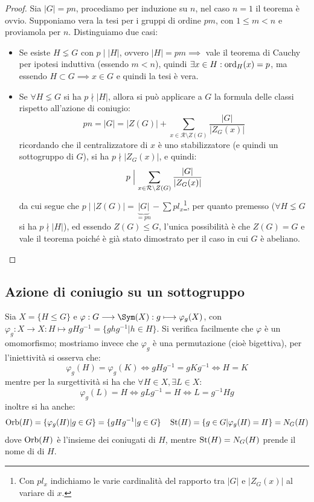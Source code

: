 \documentclass[11pt]{scrartcl}
\begin{document}
\begin{proof}
    Sia $|G| = pn$, procediamo per induzione su $n$, nel caso $n = 1$ il teorema è ovvio. Supponiamo vera la tesi per i gruppi di ordine $pm$, con 
    $1 \leq m < n$ e proviamola per $n$. Distinguiamo due casi:
        \begin{itemize}
            \item Se esiste $H \lneq G$ con $p \mid |H|$, ovvero $|H| = pm \implies$ vale il teorema di Cauchy per ipotesi induttiva (essendo $m<n$), quindi 
            $\exists x \in H : \operatorname{ord}_H(x) = p$, ma essendo $H \subset G \implies x \in G$ e quindi la tesi è vera.
            \item Se $\forall H \lneq G$ si ha $p \nmid |H|$, allora si può applicare a $G$ la formula delle classi rispetto all'azione di coniugio:
                \[ pn = |G| = |Z(G)| + \sum_{x \in \mathcal{R}\setminus{Z(G)}} \frac{|G|}{|Z_G(x)|}
                    \]
                ricordando che il centralizzatore di $x$ è uno stabilizzatore (e quindi un sottogruppo di $G$), si ha $p \nmid |Z_G(x)|$, e quindi:
                    \[ p \Bigm| \sum_{x \in \mathcal{R}\setminus{Z(G)}} \frac{|G|}{|Z_G(x)|}
                        \]
                da cui segue che $p \mid |Z(G)| = \underbrace{|G|}_{= pn} - \sum pl_x$\footnote{Con $pl_x$ indichiamo le varie cardinalità del rapporto tra $|G|$ e $|Z_G(x)|$ al variare di $x$.}, per quanto premesso ($\forall H \lneq G$ si ha $p \nmid |H|$), ed essendo $Z(G) \leqslant G$, l'unica 
                possibilità è che $Z(G) = G$ e vale il teorema poiché è già stato dimostrato per il caso in cui $G$ è abeliano.
        \end{itemize}
\end{proof}

\newpage
\subsection{Azione di coniugio su un sottogruppo}
Sia $X = \{H \leqslant G\}$ e $\varphi : G \longrightarrow \Sym(X) : g \longmapsto \varphi_g(X)$, con $\varphi_g : X \longrightarrow X : H \longmapsto gHg^{-1} = \{ghg^{-1} | h \in H\}$. 
    Si verifica facilmente che $\varphi$ è un omomorfismo; mostriamo invece che $\varphi_g$ è una permutazione (cioè bigettiva), per l'iniettività si osserva che:
        \[ \varphi_g(H) = \varphi_g(K) \iff gHg^{-1} = gKg^{-1} \iff H = K
            \]
    mentre per la surgettività si ha che $\forall H \in X, \exists L \in X$:
        \[ \varphi_g(L) = H \iff gLg^{-1} = H \iff L = g^{-1}Hg
            \]
    inoltre si ha anche:
        \[ \operatorname{Orb}(H) = \{\varphi_g(H) | g \in G\} = \{gHg^{-1}| g \in G\} \quad \operatorname{St}(H) = \{g \in G | \varphi_g(H) = H\} = N_G(H)
            \]
    dove $\operatorname{Orb}(H)$ è l'insieme dei coniugati di $H$, mentre $\operatorname{St}(H) = N_G(H)$ prende il nome di  di $H$.
\end{document}
